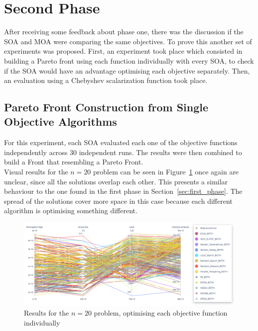 \section{Second Phase}

After receiving some feedback about phase one, there was the discussion if the SOA and MOA were comparing the same objectives. To prove this another set of experiments was proposed. First, an experiment took place which consisted in building a Pareto front using each function individually with every SOA, to check if the SOA would have an advantage optimising each objective separately. Then, an evaluation using a Chebyshev scalarization function took place.\\

\subsection{Pareto Front Construction from Single Objective Algorithms}
\label{sec:front_construction}

For this experiment, each SOA evaluated each one of the objective functions independently across {30} independent runs. The results were then combined to build a Front that resembling a Pareto Front.\\ 

Visual results for the $n=20$ problem can be seen in Figure~\ref{fig:front_mixed_20} once again are unclear, since all the solutions overlap each other. This presents a similar behaviour to the one found in the first phase in Section~\ref{sec:first_phase}. The spread of the solutions cover more space in this case because each different algorithm is optimising something different.\\

\begin{figure}[H]
    \centering
    \includegraphics[width=\textwidth]{images/mixed_front_20.png}
    \caption{Results for the $n=20$ problem, optimising each objective function individually}
    \label{fig:front_mixed_20}
\end{figure}

